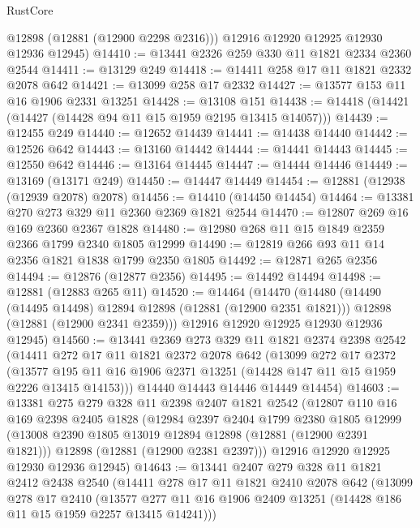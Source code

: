 \begin{lexlean}{RustCore}
\begin{coremodule}
        @12898
        (@12881 (@12900 @2298 @2316)))
      @12916
      @12920
      @12925
      @12930
      @12936
      @12945)
@14410 := @13441 @2326 @259 @330 @11 @1821 @2334 @2360 @2544
@14411 := @13129 @249
@14418 := @14411 @258 @17 @11 @1821 @2332 @2078 @642
@14421 := @13099 @258 @17 @2332
@14427 := @13577 @153 @11 @16 @1906 @2331 @13251
@14428 := @13108 @151
@14438 := @14418 (@14421 (@14427 (@14428 @94 @11 @15 @1959 @2195 @13415 @14057)))
@14439 := @12455 @249
@14440 := @12652 @14439
@14441 := @14438 @14440
@14442 := @12526 @642
@14443 := @13160 @14442
@14444 := @14441 @14443
@14445 := @12550 @642
@14446 := @13164 @14445
@14447 := @14444 @14446
@14449 := @13169 (@13171 @249)
@14450 := @14447 @14449
@14454 := @12881 (@12938 (@12939 @2078) @2078)
@14456 := @14410 (@14450 @14454)
@14464 := @13381 @270 @273 @329 @11 @2360 @2369 @1821 @2544
@14470 := @12807 @269 @16 @169 @2360 @2367 @1828
@14480 := @12980 @268 @11 @15 @1849 @2359 @2366 @1799 @2340 @1805 @12999
@14490 := @12819 @266 @93 @11 @14 @2356 @1821 @1838 @1799 @2350 @1805
@14492 := @12871 @265 @2356
@14494 := @12876 (@12877 @2356)
@14495 := @14492 @14494
@14498 := @12881 (@12883 @265 @11)
@14520 := @14464
    (@14470
      (@14480
        (@14490 (@14495 @14498) @12894 @12898 (@12881 (@12900 @2351 @1821)))
        @12898
        (@12881 (@12900 @2341 @2359)))
      @12916
      @12920
      @12925
      @12930
      @12936
      @12945)
@14560 := @13441
    @2369
    @273
    @329
    @11
    @1821
    @2374
    @2398
    @2542
    (@14411
      @272
      @17
      @11
      @1821
      @2372
      @2078
      @642
      (@13099
        @272
        @17
        @2372
        (@13577 @195 @11 @16 @1906 @2371 @13251 (@14428 @147 @11 @15 @1959 @2226 @13415 @14153)))
      @14440
      @14443
      @14446
      @14449
      @14454)
@14603 := @13381
    @275
    @279
    @328
    @11
    @2398
    @2407
    @1821
    @2542
    (@12807
      @110
      @16
      @169
      @2398
      @2405
      @1828
      (@12984
        @2397
        @2404
        @1799
        @2380
        @1805
        @12999
        (@13008 @2390 @1805 @13019 @12894 @12898 (@12881 (@12900 @2391 @1821)))
        @12898
        (@12881 (@12900 @2381 @2397)))
      @12916
      @12920
      @12925
      @12930
      @12936
      @12945)
@14643 := @13441
    @2407
    @279
    @328
    @11
    @1821
    @2412
    @2438
    @2540
    (@14411
      @278
      @17
      @11
      @1821
      @2410
      @2078
      @642
      (@13099
        @278
        @17
        @2410
        (@13577 @277 @11 @16 @1906 @2409 @13251 (@14428 @186 @11 @15 @1959 @2257 @13415 @14241)))

\end{coremodule}
\end{lexlean}
